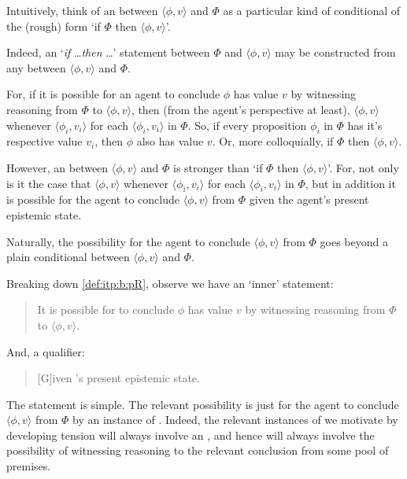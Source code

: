 \begin{note}
  Intuitively, think of an \itp{} between \(\langle \phi,v \rangle\) and \(\Phi\) as a particular kind of conditional of the (rough) form `if \(\Phi\) then \(\langle \phi,v \rangle\)'.

  Indeed, an `\emph{if} \dots \emph{then} \dots' statement between \(\Phi\) and \(\langle \phi,v \rangle\) may be constructed from any \itp{} between \(\langle \phi,v \rangle\) and \(\Phi\).

  For, if it is possible for an agent to conclude \(\phi\) has value \(v\) by witnessing reasoning from \(\Phi\) to \(\langle \phi,v \rangle\), then (from the agent's perspective at least), \(\langle \phi,v \rangle\) whenever \(\langle \phi_{i},v_{i} \rangle\) for each \(\langle \phi_{i},v_{i} \rangle\) in \(\Phi\).
  So, if every proposition \(\phi_{i}\) in \(\Phi\) has it's respective value \(v_{i}\), then \(\phi\) also has value \(v\).
  Or, more colloquially, if \(\Phi\) then \(\langle \phi,v \rangle\).

  However, an \itp{} between \(\langle \phi,v \rangle\) and \(\Phi\) is stronger than `if \(\Phi\) then \(\langle \phi,v \rangle\)'.
  For, not only is it the case that \(\langle \phi,v \rangle\) whenever \(\langle \phi_{i},v_{i} \rangle\) for each \(\langle \phi_{i},v_{i} \rangle\) in \(\Phi\), but in addition it is possible for the agent to conclude \(\langle \phi,v \rangle\) from \(\Phi\) given the agent's present epistemic state.

  Naturally, the possibility for the agent to conclude \(\langle \phi,v \rangle\) from \(\Phi\) goes beyond a plain conditional between \(\langle \phi,v \rangle\) and \(\Phi\).

  Breaking down \autoref{def:itp:b:pR}, observe we have an `inner' statement:
  \begin{quote}
     It is possible for \vAgent{} to conclude \(\phi\) has value \(v\) by witnessing reasoning from \(\Phi\) to \(\langle \phi,v \rangle\).
  \end{quote}
  And, a qualifier:
  \begin{quote}
    [G]iven \vAgent{}'s present epistemic state.
  \end{quote}

  The statement is simple.
  The relevant possibility is just for the agent to conclude \(\langle \phi,v \rangle\) from \(\Phi\) by an instance of \adA{}.
  Indeed, the relevant instances of \EAS{} we motivate by developing tension will always involve an \itp{}, and hence will always involve the possibility of witnessing reasoning to the relevant conclusion from some pool of premises.


\end{note}

